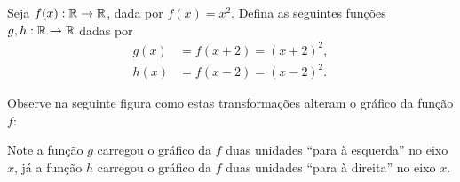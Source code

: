  \begin{exem}
  Seja $f(x): \mathbb{R} \to \mathbb{R}$, dada por $f(x)= x^2$. Defina as seguintes funções $g,h: \mathbb{R} \to \mathbb{R}$ dadas por 
  \begin{align*}
        g(x) &= f(x+2)= (x+2)^2,\\
        h(x) &= f(x-2)= (x-2)^2.
  \end{align*}
  
    Observe na seguinte figura como estas transformações alteram o gráfico da função $f$:

    \begin{center}
\end{center}

    Note a função $g$ carregou o gráfico da $f$ duas unidades ``para à esquerda'' no eixo $x$, já a função $h$ carregou o gráfico da $f$ duas unidades ``para à direita'' no eixo $x$.

 \end{exem}

